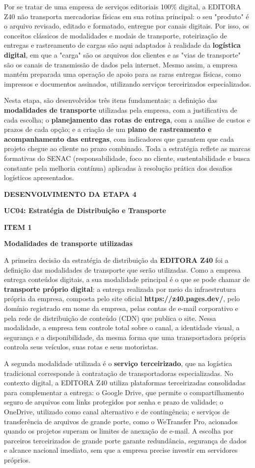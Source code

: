 \documentclass[10pt,a4paper]{article}
\newcommand{\zsiteplain}{https://\allowbreak{}z40.pages\allowbreak{}.dev/\allowbreak{}}
\newcommand{\zsite}{\textbf{\zsiteplain}}
\newcommand{\boxfont}{\fontsize{8.1}{14.2}\selectfont}
\newcommand{\labelfont}{\fontsize{5.8}{7.5}\selectfont\bfseries\addfontfeatures{LetterSpace=15}}
\newcommand{\headingfont}{\fontsize{9.8}{12}\selectfont\bfseries\color{navy}}
\newcommand{\itemh}[2]{\needspace{6\baselineskip}%
  {\labelfont\color{graylab}ITEM #1}\par\vspace{5pt}%
  {\headingfont #2}\par\vspace{8pt}}
\newcommand{\devbarra}[2]{%
  \begin{navybox}\boxfont
    {\labelfont\color{lighttxt}#1}\par\vspace{4pt}%
    {\fontsize{8.6}{13}\selectfont\bfseries\color{white}#2\par}
  \end{navybox}\vspace{22pt}}
\begin{document}
Por se tratar de uma empresa de serviços editoriais 100\% digital, a EDITORA Z40 não transporta mercadorias físicas em sua rotina principal: o seu "produto" é o arquivo revisado, editado e formatado, entregue por canais digitais. Por isso, os conceitos clássicos de modalidades e modais de transporte, roteirização de entregas e rastreamento de cargas são aqui adaptados à realidade da \textbf{logística digital}, em que a "carga" são os arquivos dos clientes e as "vias de transporte" são os canais de transmissão de dados pela internet. Mesmo assim, a empresa mantém preparada uma operação de apoio para as raras entregas físicas, como impressos e documentos assinados, utilizando serviços terceirizados especializados.

Nesta etapa, são desenvolvidos três itens fundamentais: a definição das \textbf{modalidades de transporte} utilizadas pela empresa, com a justificativa de cada escolha; o \textbf{planejamento das rotas de entrega}, com a análise de custos e prazos de cada opção; e a criação de um \textbf{plano de rastreamento e acompanhamento das entregas}, com indicadores que garantem que cada projeto chegue ao cliente no prazo combinado. Toda a estratégia reflete as marcas formativas do SENAC (responsabilidade, foco no cliente, sustentabilidade e busca constante pela melhoria contínua) aplicadas à resolução prática dos desafios logísticos apresentados.

\devbarra{DESENVOLVIMENTO DA ETAPA 4}{UC04: Estratégia de Distribuição e Transporte}

\itemh{1}{Modalidades de transporte utilizadas}

A primeira decisão da estratégia de distribuição da \textbf{EDITORA Z40} foi a definição das modalidades de transporte que serão utilizadas. Como a empresa entrega conteúdos digitais, a sua modalidade principal é o que se pode chamar de \textbf{transporte próprio digital}: a entrega realizada por meio da infraestrutura própria da empresa, composta pelo site oficial \zsite, pelo domínio registrado em nome da empresa, pelas contas de e-mail corporativo e pela rede de distribuição de conteúdo (CDN) que publica o site. Nessa modalidade, a empresa tem controle total sobre o canal, a identidade visual, a segurança e a disponibilidade, da mesma forma que uma transportadora própria controla seus veículos, suas rotas e seus motoristas.

A segunda modalidade utilizada é o \textbf{serviço terceirizado}, que na logística tradicional corresponde à contratação de transportadoras especializadas. No contexto digital, a EDITORA Z40 utiliza plataformas terceirizadas consolidadas para complementar a entrega: o Google Drive, que permite o compartilhamento seguro de arquivos com links protegidos por senha e prazo de validade; o OneDrive, utilizado como canal alternativo e de contingência; e serviços de transferência de arquivos de grande porte, como o WeTransfer Pro, acionados quando os projetos superam os limites de anexação de e-mail. A escolha por parceiros terceirizados de grande porte garante redundância, segurança de dados e alcance nacional imediato, sem que a empresa precise investir em servidores próprios.
\end{document}
